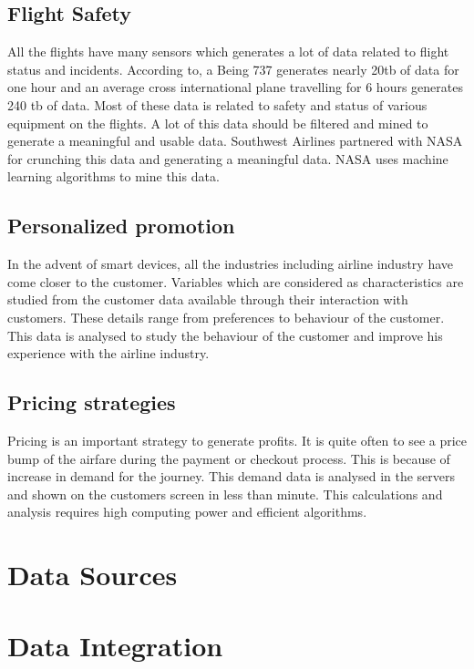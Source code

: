 \documentclass[sigconf]{acmart}
\begin{document}
\subsection{Flight Safety}

All the flights have many sensors which generates a lot of data related to flight status and incidents. According to, a Being 737 generates nearly 20tb of data for one hour and an average cross international plane travelling for 6 hours generates 240 tb of data.  Most of these data is related to safety and status of various equipment on the flights. A lot of this data should be filtered and mined to generate a meaningful and usable data. Southwest Airlines partnered with NASA for crunching this data and generating a meaningful data. NASA uses machine learning algorithms to mine this data. 

\subsection{Personalized promotion}

In the advent of smart devices, all the industries including airline industry have come closer to the customer. Variables which are considered as characteristics are studied from the customer data available through their interaction with customers. These details range from preferences to behaviour of the customer. This data is analysed to study the behaviour of the customer and improve his experience with the airline industry. 

\subsection{Pricing strategies}

Pricing is an important strategy to generate profits. It is quite often to see a price bump of the airfare during the payment or checkout process. This is because of increase in demand for the journey. This demand data is analysed in the servers and shown on the customers screen in less than minute. This calculations and analysis requires high computing power and efficient algorithms. 


\section{Data Sources}


\section{Data Integration}
\end{document}
